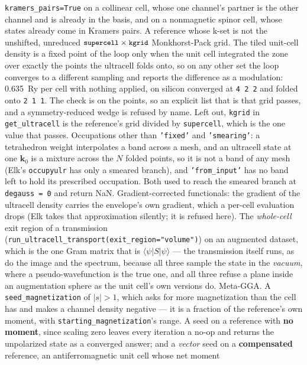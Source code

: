 \documentclass[11pt,a4paper]{article}
\newcommand{\code}[1]{\texttt{\small #1}}
\begin{document}
\begin{refuses}
\code{kramers\_pairs=True} on a collinear cell, whose one channel's partner is
the other channel and is already in the basis, and on a nonmagnetic spinor
cell, whose states already come in Kramers pairs.
A reference whose k-set is not the unshifted, unreduced
$\code{supercell} \times \code{kgrid}$ Monkhorst-Pack grid. The tiled unit-cell
density is a fixed point of the loop only when the unit cell integrated the zone
over exactly the points the ultracell folds onto, so on any other set the loop
converges to a different sampling and reports the difference as a modulation:
0.635~Ry per cell with nothing applied, on silicon converged at \code{4 2 2} and
folded onto \code{2 1 1}. The check is on the points, so an explicit list that
is that grid passes, and a symmetry-reduced wedge is refused by name. Left out,
\code{kgrid} in \code{get\_ultracell} is the reference's grid divided by
\code{supercell}, which is the one value that passes. Occupations other than
\code{'fixed'} and \code{'smearing'}: a tetrahedron weight interpolates a band
across a mesh, and an ultracell state at one $\mathbf k_0$ is a mixture across
the $N$ folded points, so it is not a band of any mesh (Elk's
\code{occupyulr} has only a smeared branch), and \code{'from\_input'} has no
band left to hold its prescribed occupation. Both used to reach the smeared
branch at \code{degauss = 0} and return NaN.
Gradient-corrected functionals: the gradient of the
ultracell density carries the envelope's own gradient, which a per-cell
evaluation drops (Elk takes that approximation silently; it is refused here).
The \emph{whole-cell} exit region of a transmission
(\code{run\_ultracell\_transport(exit\_region="volume")}) on an augmented
dataset, which is the one Gram matrix that is $\langle\psi|S|\psi\rangle$ ---
the transmission itself runs, as do the image and the spectrum, because all
three sample the state in the \emph{vacuum}, where a pseudo-wavefunction is the
true one, and all three refuse a plane inside an augmentation sphere as the unit
cell's own versions do.
Meta-GGA. A \code{seed\_magnetization} of $|s| > 1$, which asks for more
magnetization than the cell has and makes a channel density negative --- it is
a fraction of the reference's own moment, with
\code{starting\_magnetization}'s range. A seed on a reference with \textbf{no
moment}, since scaling zero leaves every iteration a no-op and returns the
unpolarized state as a converged answer; and a \emph{vector} seed on a
\textbf{compensated} reference, an antiferromagnetic unit cell whose net moment

\end{refuses}
\end{document}
